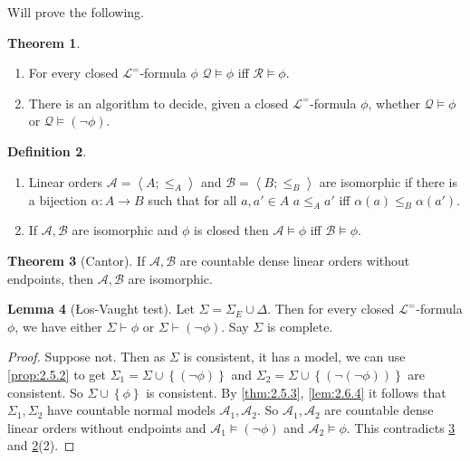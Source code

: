 \documentclass{article}
\newcommand{\rb}[1]{\left( #1 \right)}
\newcommand{\cb}[1]{\left\{ #1 \right\}}
\newcommand{\ab}[1]{\left\langle #1 \right\rangle}
\newcommand{\notb}[1]{\rb{\neg #1}}
\theoremstyle{definition}\newtheorem{definition}{Definition}[subsection]
\theoremstyle{definition}\newtheorem{remark}[definition]{Remark}
\theoremstyle{definition}\newtheorem*{example}{Example}
\theoremstyle{definition}\newtheorem*{note}{Note}
\newtheorem{lemma}[definition]{Lemma}
\newtheorem{theorem}[definition]{Theorem}
\begin{document}
Will prove the following.

\begin{theorem}
\label{thm:2.7.2}
\hfill
\begin{enumerate}
\item For every closed $ \mathcal{L}^= $-formula $ \phi $ $ \mathcal{Q} \vDash \phi $ iff $ \mathcal{R} \vDash \phi $.
\item There is an algorithm to decide, given a closed $ \mathcal{L}^= $-formula $ \phi $, whether $ \mathcal{Q} \vDash \phi $ or $ \mathcal{Q} \vDash \notb{\phi} $.
\end{enumerate}
\end{theorem}

\begin{definition}
\label{def:2.7.3}
\hfill
\begin{enumerate}
\item Linear orders $ \mathcal{A} = \ab{A; \le_A} $ and $ \mathcal{B} = \ab{B; \le_B} $ are isomorphic if there is a bijection $ \alpha : A \to B $ such that for all $ a, a' \in A $ $ a \le_A a' $ iff $ \alpha\rb{a} \le_B \alpha\rb{a'} $.
\item If $ \mathcal{A}, \mathcal{B} $ are isomorphic and $ \phi $ is closed then $ \mathcal{A} \vDash \phi $ iff $ \mathcal{B} \vDash \phi $.
\end{enumerate}
\end{definition}

\begin{theorem}[Cantor]
\label{thm:2.7.4}
If $ \mathcal{A}, \mathcal{B} $ are countable dense linear orders without endpoints, then $ \mathcal{A}, \mathcal{B} $ are isomorphic.
\end{theorem}

\begin{lemma}[Łos-Vaught test]
\label{lem:2.7.5}
Let $ \Sigma = \Sigma_E \cup \Delta $. Then for every closed $ \mathcal{L}^= $-formula $ \phi $, we have either $ \Sigma \vdash \phi $ or $ \Sigma \vdash \notb{\phi} $. Say $ \Sigma $ is complete.
\end{lemma}

\begin{proof}
Suppose not. Then as $ \Sigma $ is consistent, it has a model, we can use \ref{prop:2.5.2} to get $ \Sigma_1 = \Sigma \cup \cb{\notb{\phi}} $ and $ \Sigma_2 = \Sigma \cup \cb{\notb{\notb{\phi}}} $ are consistent. So $ \Sigma \cup \cb{\phi} $ is consistent. By \ref{thm:2.5.3}, \ref{lem:2.6.4} it follows that $ \Sigma_1, \Sigma_2 $ have countable normal models $ \mathcal{A}_1, \mathcal{A}_2 $. So $ \mathcal{A}_1, \mathcal{A}_2 $ are countable dense linear orders without endpoints and $ \mathcal{A}_1 \vDash \notb{\phi} $ and $ \mathcal{A}_2 \vDash \phi $. This contradicts \ref{thm:2.7.4} and \ref{def:2.7.3}(2).
\end{proof}
\end{document}
